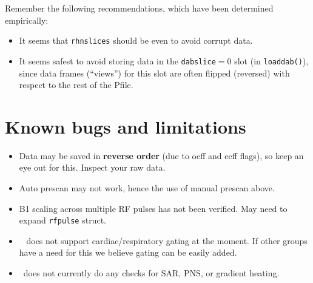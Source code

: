 Remember the following recommendations, which have been determined empirically:
\begin{itemize}
	\item It seems that {\tt rhnslices} should be even to avoid corrupt data.
	\item It seems safest to avoid storing data in the {\tt dabslice}$=$0 slot (in \texttt{loaddab()}), since data frames (``views'') for this slot are often flipped (reversed) with respect to the rest of the Pfile.
\end{itemize}


\section{Known bugs and limitations}
\begin{itemize}
	\item Data may be saved in \textbf{reverse order} (due to oeff and eeff flags), so keep an eye out for this. Inspect your raw data. %
	\item Auto prescan may not work, hence the use of manual prescan above.
	\item B1 scaling across multiple RF pulses has not been verified. May need to expand \texttt{rfpulse} struct.
	\item \toppe~ does not support cardiac/respiratory gating at the moment. If other groups have a need for this we believe gating can be easily added.
	\item \toppe~does not currently do any checks for SAR, PNS, or gradient heating.
\end{itemize}

